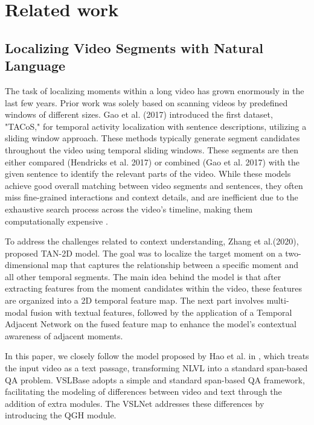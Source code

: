 \documentclass[10pt,twocolumn,letterpaper]{article}
\begin{document}
\section{Related work}

\subsection{Localizing Video Segments with Natural Language}

The task of localizing moments within a long video has grown enormously in the last few years. Prior work was solely based on scanning videos by predefined windows of different sizes. Gao et al. (2017) introduced the first dataset, "TACoS," for temporal activity localization with sentence descriptions, utilizing a sliding window approach. These methods typically generate segment candidates throughout the video using temporal sliding windows. These segments are then either compared (Hendricks et al. 2017) or combined (Gao et al. 2017) with the given sentence to identify the relevant parts of the video. While these models achieve good overall matching between video segments and sentences, they often miss fine-grained interactions and context details, and are inefficient due to the exhaustive search process across the video's timeline, making them computationally expensive \cite{b4}.


To address the challenges related to context understanding, Zhang et al.(2020), proposed TAN-2D model. The goal was to localize the target moment on a two-dimensional map that captures the relationship between a specific moment and all other temporal segments. The main idea behind the model is that after extracting features from the moment candidates within the video, these features are organized into a 2D temporal feature map. The next part involves multi-modal fusion with textual features, followed by the application of a Temporal Adjacent Network on the fused feature map to enhance the model's contextual awareness of adjacent moments.

In this paper, we closely follow the model proposed by Hao et al. in \cite{b3}, which treats the input video as a text passage, transforming NLVL into a standard span-based QA problem. VSLBase adopts a simple and standard span-based QA framework, facilitating the modeling of differences between video and text through the addition of extra modules. The VSLNet addresses these differences by introducing the QGH module.
\end{document}
